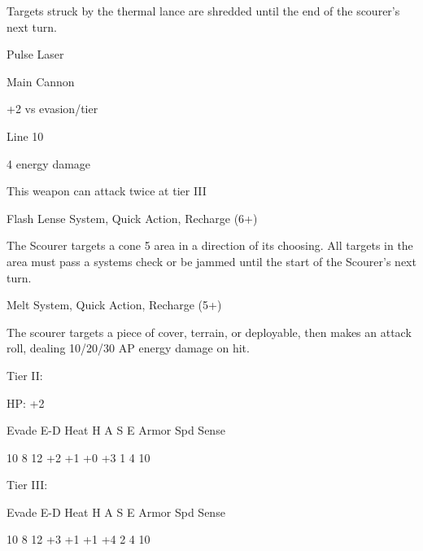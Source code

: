 Targets struck by the thermal lance are shredded until the end of the scourer’s next turn.
 

Pulse Laser
 
Main Cannon
 
+2 vs evasion/tier
 
Line 10
 
4 energy damage
 
This weapon can attack twice at tier III
 

Flash Lense  
System, Quick Action, Recharge (6+)
 
The Scourer targets a cone 5 area in a direction of its choosing. All targets in the area must pass  
a systems check or be jammed until the start of the Scourer’s next turn.
 

Melt  
System, Quick Action, Recharge (5+)
 
The scourer targets a piece of cover, terrain, or deployable, then makes an attack roll, dealing  
10/20/30 AP energy damage on hit.
 

Tier II:
 
HP: +2
 

          Evade    E-D    Heat     H    A     S     E       Armor        Spd      Sense 

          10       8      12       +2   +1    +0    +3      1            4        10 

Tier III:
 

          Evade    E-D    Heat     H    A     S     E       Armor        Spd      Sense 

          10       8      12       +3   +1    +1    +4      2            4        10 
